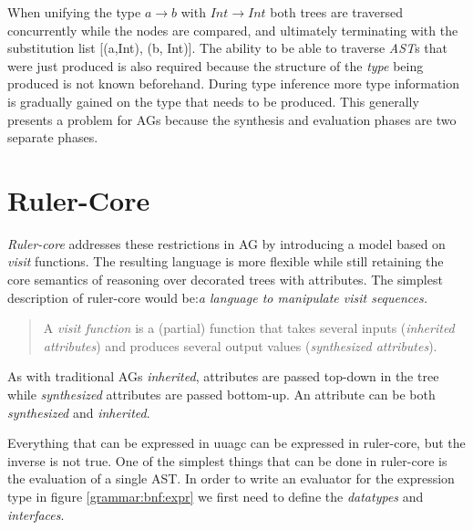 \documentclass[twoside, titlepage, openright, a4paper]{book}
\newcommand{\Rcore}{\emph{Ruler-core }}
\begin{document}
When unifying the type \emph{$a \rightarrow b$} with \emph{$Int \rightarrow Int$} both trees are traversed concurrently while the nodes are compared, and ultimately terminating with the substitution list [(a,Int), (b, Int)]. The ability to be able to traverse \emph{AST}s that were just produced is also required because the structure of the \emph{type} being produced is not known beforehand. During type inference more type information is gradually gained on the type that needs to be produced. This generally presents a problem for AGs\cite{ruler-front} because the synthesis and evaluation phases are two separate phases.

\section{Ruler-Core}
\Rcore addresses these restrictions in AG by introducing a model based on \emph{visit}\cite{visits} functions. The resulting language is more flexible while still retaining the core semantics of reasoning over decorated trees with attributes. The simplest description of ruler-core would be:\emph{a language to manipulate visit sequences.}

\begin{quotation}
A \emph{visit function}\cite{visitag} is a (partial) function that takes several inputs (\emph{inherited attributes}) and produces several output values (\emph{synthesized attributes}).
\end{quotation}

As with traditional AGs \emph{inherited}, attributes are passed top-down in the tree while \emph{synthesized} attributes are passed bottom-up. An attribute can be both \emph{synthesized} and \emph{inherited}.

Everything that can be expressed in uuagc can be expressed in ruler-core, but the inverse is not true. One of the simplest things that can be done in ruler-core is the evaluation of a single AST. In order to write an evaluator for the expression type in figure \ref{grammar:bnf:expr} we first need to define the \emph{datatypes} and \emph{interfaces}.
\end{document}
